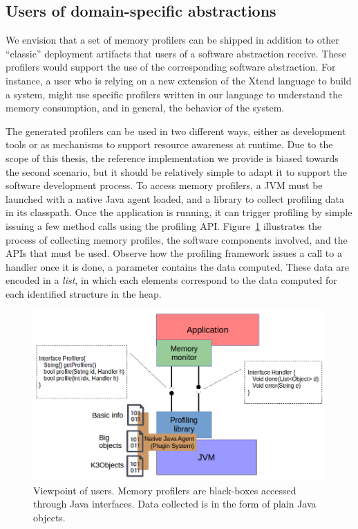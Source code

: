 \subsection{Users of domain-specific abstractions} \label{sec:dsl-tooling-users}

We envision that a set of memory profilers can be shipped in addition to other ``classic'' deployment artifacts that users of a software abstraction receive. 
These profilers would support the use of the corresponding software abstraction.
For instance, a user who is relying on a new extension of the Xtend language to build a system, might use specific profilers written in our language to understand the memory consumption, and in general, the behavior of the system.

The generated profilers can be used in two different ways, either as development tools or as mechanisms to support resource awareness at runtime.
Due to the scope of this thesis, the reference implementation we provide is biased towards the second scenario, but it should be relatively simple to adapt it to support the software development process.
To access memory profilers, a JVM must be launched with a native Java agent loaded, and a library to collect profiling data in its classpath.
Once the application is running, it can trigger profiling by simple issuing a few method calls using the profiling API.
Figure~\ref{fig:user-profiling-library-view} illustrates the process of collecting memory profiles, the software components involved, and the APIs that must be used.
Observe how the profiling framework issues a call to a handler once it is done, a parameter contains the data computed.
These data are encoded in a \textit{list}, in which each elements correspond to the data computed for each identified structure in the heap.

\begin{figure}[!b]
\centering
\includegraphics[scale=0.6]{./chapter6/fig/user-profiler-view.png}
\caption{Viewpoint of users. Memory profilers are black-boxes accessed through Java interfaces. Data collected is in the form of plain Java objects.}\label{fig:user-profiling-library-view}
\end{figure}

